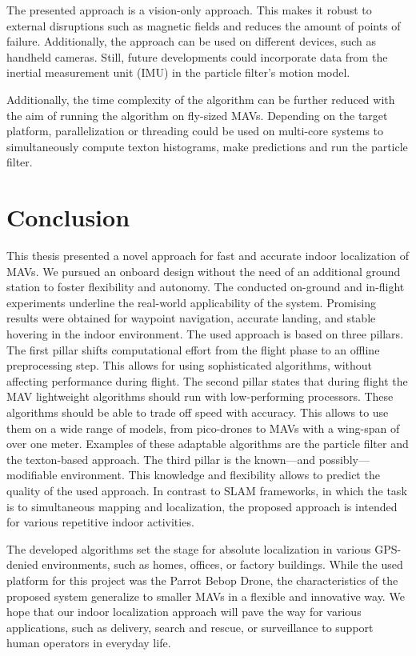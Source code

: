 \documentclass{report}
\begin{document}
The presented approach is a vision-only approach. This makes it robust
to external disruptions such as magnetic fields and reduces the amount
of points of failure. Additionally, the approach can be used on
different devices, such as handheld cameras. Still, future
developments could incorporate data from the inertial measurement unit
(IMU) in the particle filter's motion model.

Additionally, the time complexity of the algorithm can be further
reduced with the aim of running the algorithm on fly-sized
MAVs. Depending on the target platform, parallelization or threading
could be used on multi-core systems to simultaneously compute texton
histograms, make predictions and run the particle filter.



\chapter{Conclusion}
\label{chap:conclusion}

This thesis presented a novel approach for fast and accurate indoor
localization of MAVs. We pursued an onboard design without the need of
an additional ground station to foster flexibility and autonomy. The
conducted on-ground and in-flight experiments underline the real-world
applicability of the system. Promising results were obtained for
waypoint navigation, accurate landing, and stable hovering in the
indoor environment. The
used approach is based on three pillars.\\
The first pillar shifts computational effort from the flight phase to
an offline preprocessing step. This allows for using sophisticated
algorithms, without affecting performance during flight.  The second
pillar states that during flight the MAV lightweight algorithms should
run with low-performing processors. These algorithms should be able to
trade off speed with accuracy. This allows to use them on a wide range
of models, from pico-drones to MAVs with a wing-span of over one
meter. Examples of these adaptable algorithms are the particle filter
and the texton-based approach.  The third pillar is the known---and
possibly---modifiable environment. This knowledge and flexibility
allows to predict the quality of the used approach. In contrast to
SLAM frameworks, in which the task is to simultaneous mapping and
localization, the proposed approach is intended for various repetitive
indoor activities.


The developed algorithms set the stage for absolute localization in
various GPS-denied environments, such as homes, offices, or factory
buildings. While the used platform for this project was the Parrot
Bebop Drone, the characteristics of the proposed system generalize to
smaller MAVs in a flexible and innovative way.  We hope that our
indoor localization approach will pave the way for various
applications, such as delivery, search and rescue, or surveillance to
support human operators in everyday life.

\printbibliography
\end{document}
